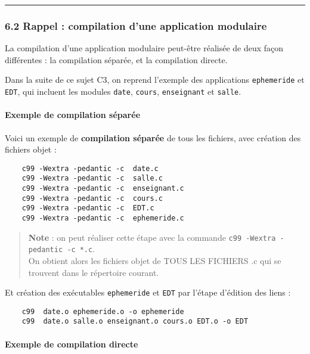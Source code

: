 \documentclass[11pt]{article}
\begin{document}
    \begin{center}\rule{0.5\linewidth}{\linethickness}\end{center}

    \subsubsection{6.2 Rappel : compilation d'une application
modulaire}\label{rappel-compilation-dune-application-modulaire}

La compilation d'une application modulaire peut-être réalisée de deux
façon différentes : la compilation séparée, et la compilation directe.

Dans la suite de ce sujet C3, on reprend l'exemple des applications
\texttt{ephemeride} et \texttt{EDT}, qui incluent les modules
\texttt{date}, \texttt{cours}, \texttt{enseignant} et \texttt{salle}.

\paragraph{Exemple de compilation
séparée}\label{exemple-de-compilation-suxe9paruxe9e}

Voici un exemple de \textbf{compilation séparée} de tous les fichiers,
avec création des fichiers objet :

\begin{verbatim}
    c99 -Wextra -pedantic -c  date.c 
    c99 -Wextra -pedantic -c  salle.c 
    c99 -Wextra -pedantic -c  enseignant.c 
    c99 -Wextra -pedantic -c  cours.c 
    c99 -Wextra -pedantic -c  EDT.c 
    c99 -Wextra -pedantic -c  ephemeride.c
\end{verbatim}

\begin{quote}
\textbf{Note} : on peut réaliser cette étape avec la commande
\texttt{c99\ -Wextra\ -pedantic\ -c\ *.c}.\\
On obtient alors les fichiers objet de TOUS LES FICHIERS .c qui se
trouvent dans le répertoire courant.
\end{quote}

Et création des exécutables \texttt{ephemeride} et \texttt{EDT} par
l'étape d'édition des liens :

\begin{verbatim}
    c99  date.o ephemeride.o -o ephemeride 
    c99  date.o salle.o enseignant.o cours.o EDT.o -o EDT 
\end{verbatim}

\paragraph{Exemple de compilation
directe}\label{exemple-de-compilation-directe}
\end{document}
